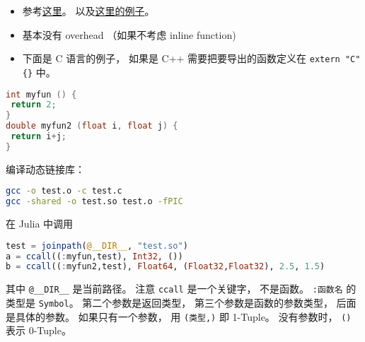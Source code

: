 
\begin{issues}
\issueDraft
\end{issues}

\begin{itemize}
\item 参考\href{https://docs.julialang.org/en/v1/manual/calling-c-and-fortran-code/}{这里}。 以及\href{https://discourse.julialang.org/t/how-to-make-julia-call-c-c-coded-function/54780/5}{这里的例子}。
\item 基本没有 overhead （如果不考虑 inline function)
\item 下面是 C 语言的例子， 如果是 C++ 需要把要导出的函数定义在 \verb`extern "C" {}` 中。
\end{itemize}

\begin{lstlisting}[language=cpp]
int myfun () {
 return 2;
}
double myfun2 (float i, float j) {
 return i+j;
}
\end{lstlisting}

编译动态链接库：
\begin{lstlisting}[language=bash]
gcc -o test.o -c test.c
gcc -shared -o test.so test.o -fPIC
\end{lstlisting}

在 Julia 中调用
\begin{lstlisting}[language=julia]
test = joinpath(@__DIR__, "test.so")
a = ccall((:myfun,test), Int32, ())
b = ccall((:myfun2,test), Float64, (Float32,Float32), 2.5, 1.5)
\end{lstlisting}
其中 \verb`@__DIR__` 是当前路径。 注意 \verb`ccall` 是一个关键字， 不是函数。 \verb`:函数名` 的类型是 \verb`Symbol`。 第二个参数是返回类型， 第三个参数是函数的参数类型， 后面是具体的参数。 如果只有一个参数， 用 \verb`(类型,)` 即 1-Tuple。 没有参数时， \verb`()` 表示 0-Tuple。
